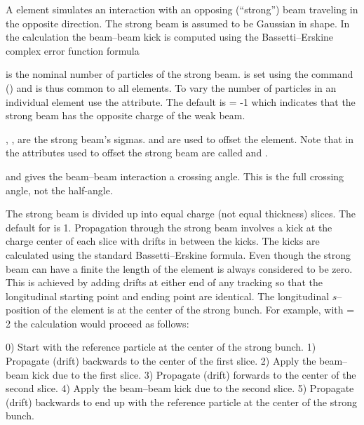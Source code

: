 A  element simulates an interaction with an opposing
(``strong'') beam traveling in the opposite direction. The strong beam
is assumed to be Gaussian in shape. In the 
calculation the beam--beam kick is computed using the
Bassetti--Erskine complex error function formula\cite{b:talman}

 is the nominal number of particles of the strong
beam.  is set using the  command
() and is thus common to all  elements.  To
vary the number of particles in an individual  element use the
 attribute. The default is  = -1 which indicates
that the strong beam has the opposite charge of the weak beam.

, ,  are the strong beam's sigmas. 
 and  are used to offset the
 element. Note that in \mad the attributes used to
offset the strong beam are called  and .

 and  gives the beam--beam interaction a
crossing angle. This is the full crossing angle, not the half-angle.

The strong beam is divided up into  equal charge (not equal
thickness) slices. The default for  is 1. Propagation
through the strong beam involves a kick at the charge center of each
slice with drifts in between the kicks. The kicks are calculated using
the standard Bassetti--Erskine formula.  Even though the strong beam can
have a finite  the length of the element is always considered
to be zero. This is achieved by adding drifts at either end of any
tracking so that the longitudinal starting point and ending point are
identical. The longitudinal $s$--position of the
 element is at the center of the strong bunch. For example,
with  = 2 the calculation would proceed as follows:
\begin{example}
  0) Start with the reference particle at the center of the strong bunch.
  1) Propagate (drift) backwards to the center of the first slice.
  2) Apply the beam--beam kick due to the first slice.
  3) Propagate (drift) forwards to the center of the second slice.
  4) Apply the beam--beam kick due to the second slice.
  5) Propagate (drift) backwards to end up with the reference particle
     at the center of the strong bunch.
\end{example}

